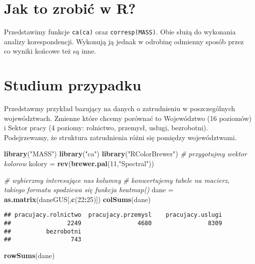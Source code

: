 \documentclass[polish,]{book}
\newenvironment{Shaded}{\begin{snugshade}}{\end{snugshade}}
\newcommand{\CommentTok}[1]{\textcolor[rgb]{0.56,0.35,0.01}{\textit{#1}}}
\newcommand{\DecValTok}[1]{\textcolor[rgb]{0.00,0.00,0.81}{#1}}
\newcommand{\KeywordTok}[1]{\textcolor[rgb]{0.13,0.29,0.53}{\textbf{#1}}}
\newcommand{\NormalTok}[1]{#1}
\newcommand{\OperatorTok}[1]{\textcolor[rgb]{0.81,0.36,0.00}{\textbf{#1}}}
\newcommand{\StringTok}[1]{\textcolor[rgb]{0.31,0.60,0.02}{#1}}
\begin{document}
\hypertarget{part_63}{%
\section{Jak to zrobić w R?}\label{part_63}}

Przedstawimy funkcje \texttt{ca(ca)} oraz \texttt{corresp(MASS)}. Obie służą do wykonania analizy
korespondencji. Wykonują ją jednak w odrobinę odmienny sposób przez co wyniki
końcowe też są inne.

\hypertarget{part_64}{%
\section{Studium przypadku}\label{part_64}}

Przedstawmy przykład bazujący na danych o zatrudnieniu w poszczególnych województwach. Zmienne które chcemy porównać to Województwo (16 poziomów) i
Sektor pracy (4 poziomy: rolnictwo, przemysł, usługi, bezrobotni). Podejrzewamy,
że struktura zatrudnienia różni się pomiędzy województwami.

\begin{Shaded}
\begin{Highlighting}[]
\KeywordTok{library}\NormalTok{(}\StringTok{"MASS"}\NormalTok{)}
\KeywordTok{library}\NormalTok{(}\StringTok{"ca"}\NormalTok{)}
\KeywordTok{library}\NormalTok{(}\StringTok{"RColorBrewer"}\NormalTok{)}
\CommentTok{# przygotujmy wektor kolorow}
\NormalTok{kolory =}\StringTok{ }\KeywordTok{rev}\NormalTok{(}\KeywordTok{brewer.pal}\NormalTok{(}\DecValTok{11}\NormalTok{,}\StringTok{"Spectral"}\NormalTok{))}

\CommentTok{# wybierzmy interesujące nas kolumny}
\CommentTok{# konwertujemy tabele na macierz, takiego formatu spodziewa się funkcja heatmap()}
\NormalTok{dane =}\StringTok{ }\KeywordTok{as.matrix}\NormalTok{(daneGUS[,}\KeywordTok{c}\NormalTok{(}\DecValTok{22}\OperatorTok{:}\DecValTok{25}\NormalTok{)])}
\KeywordTok{colSums}\NormalTok{(dane)}
\end{Highlighting}
\end{Shaded}

\begin{verbatim}
## pracujacy.rolnictwo  pracujacy.przemysl    pracujacy.uslugi 
##                2249                4680                8309 
##          bezrobotni 
##                 743
\end{verbatim}

\begin{Shaded}
\begin{Highlighting}[]
\KeywordTok{rowSums}\NormalTok{(dane)}
\end{Highlighting}
\end{Shaded}
\end{document}
